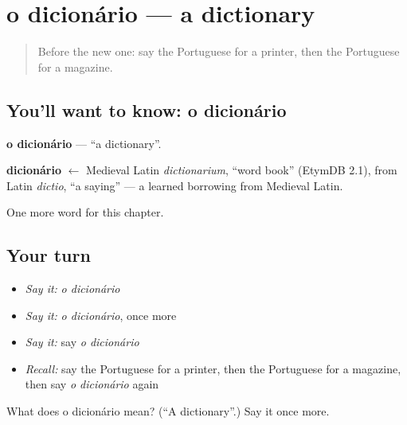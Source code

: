 \section[o dicionário]{o dicionário — a dictionary}

\label{lesson:PT-C200-dicionario}



\begin{quote}
Before the new one: say the Portuguese for a printer, then the Portuguese for a magazine.
\end{quote}

\subsection*{You'll want to know: o dicionário}
\textbf{o dicionário} — \textquotedblleft{}a dictionary\textquotedblright{}.

\begin{cousinweb}
\textbf{dicionário} $\leftarrow$ Medieval Latin \emph{dictionarium}, \textquotedblleft{}word book\textquotedblright{} (EtymDB 2.1), from Latin \emph{dictio}, \textquotedblleft{}a saying\textquotedblright{} — a learned borrowing from Medieval Latin.
\end{cousinweb}

\begin{grammarlens}[title={What you've built}]
One more word for this chapter.
\end{grammarlens}

\subsection*{Your turn}
\begin{itemize}
\raggedright
  \item \emph{Say it:} \emph{o dicionário}
  \item \emph{Say it:} \emph{o dicionário}, once more
  \item \emph{Say it:} say \emph{o dicionário}
  \item \emph{Recall:} say the Portuguese for a printer, then the Portuguese for a magazine, then say \emph{o dicionário} again
\end{itemize}

\begin{tcolorbox}[breakable,colback=teal!4,colframe=teal!35!black,title={Before you move on}]
What does o dicionário mean? (\textquotedblleft{}A dictionary\textquotedblright{}.) Say it once more.
\end{tcolorbox}
